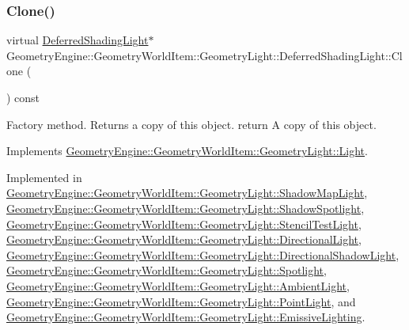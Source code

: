 \subsubsection{\texorpdfstring{Clone()}{Clone()}}
{\footnotesize\ttfamily virtual \mbox{\hyperlink{class_geometry_engine_1_1_geometry_world_item_1_1_geometry_light_1_1_deferred_shading_light}{Deferred\+Shading\+Light}}$\ast$ Geometry\+Engine\+::\+Geometry\+World\+Item\+::\+Geometry\+Light\+::\+Deferred\+Shading\+Light\+::\+Clone (\begin{DoxyParamCaption}{ }\end{DoxyParamCaption}) const\hspace{0.3cm}{\ttfamily [pure virtual]}}

Factory method. Returns a copy of this object. return A copy of this object. 

Implements \mbox{\hyperlink{class_geometry_engine_1_1_geometry_world_item_1_1_geometry_light_1_1_light_af367fa7201ad377a45fdc13e2002c518}{Geometry\+Engine\+::\+Geometry\+World\+Item\+::\+Geometry\+Light\+::\+Light}}.



Implemented in \mbox{\hyperlink{class_geometry_engine_1_1_geometry_world_item_1_1_geometry_light_1_1_shadow_map_light_a48eb6af2e6bb8487568ee4265fbc49ee}{Geometry\+Engine\+::\+Geometry\+World\+Item\+::\+Geometry\+Light\+::\+Shadow\+Map\+Light}}, \mbox{\hyperlink{class_geometry_engine_1_1_geometry_world_item_1_1_geometry_light_1_1_shadow_spotlight_a0ea8fd05d26f6e780d352168c28f940d}{Geometry\+Engine\+::\+Geometry\+World\+Item\+::\+Geometry\+Light\+::\+Shadow\+Spotlight}}, \mbox{\hyperlink{class_geometry_engine_1_1_geometry_world_item_1_1_geometry_light_1_1_stencil_test_light_a6434a228dc64537ff9984c82eaf8ab07}{Geometry\+Engine\+::\+Geometry\+World\+Item\+::\+Geometry\+Light\+::\+Stencil\+Test\+Light}}, \mbox{\hyperlink{class_geometry_engine_1_1_geometry_world_item_1_1_geometry_light_1_1_directional_light_a032fe23fba3bd8d0fd35f9d4ac6a9de0}{Geometry\+Engine\+::\+Geometry\+World\+Item\+::\+Geometry\+Light\+::\+Directional\+Light}}, \mbox{\hyperlink{class_geometry_engine_1_1_geometry_world_item_1_1_geometry_light_1_1_directional_shadow_light_ae5016cad41a62c4c870a942acc3f9afe}{Geometry\+Engine\+::\+Geometry\+World\+Item\+::\+Geometry\+Light\+::\+Directional\+Shadow\+Light}}, \mbox{\hyperlink{class_geometry_engine_1_1_geometry_world_item_1_1_geometry_light_1_1_spotlight_a7feb062f72b8110cf7d8d614d2daad92}{Geometry\+Engine\+::\+Geometry\+World\+Item\+::\+Geometry\+Light\+::\+Spotlight}}, \mbox{\hyperlink{class_geometry_engine_1_1_geometry_world_item_1_1_geometry_light_1_1_ambient_light_a890a2ff8ce5cde88cdc51b4e598ca9af}{Geometry\+Engine\+::\+Geometry\+World\+Item\+::\+Geometry\+Light\+::\+Ambient\+Light}}, \mbox{\hyperlink{class_geometry_engine_1_1_geometry_world_item_1_1_geometry_light_1_1_point_light_a68321b758cff76fa55f3cd5ef2824035}{Geometry\+Engine\+::\+Geometry\+World\+Item\+::\+Geometry\+Light\+::\+Point\+Light}}, and \mbox{\hyperlink{class_geometry_engine_1_1_geometry_world_item_1_1_geometry_light_1_1_emissive_lighting_ac7e3e90cadf700764fccdacc94238bac}{Geometry\+Engine\+::\+Geometry\+World\+Item\+::\+Geometry\+Light\+::\+Emissive\+Lighting}}.

